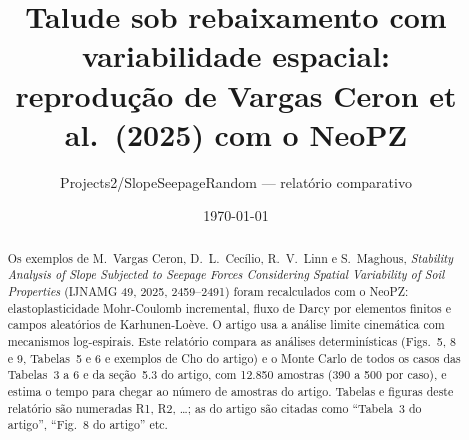 \documentclass[11pt,a4paper]{article}
\title{Talude sob rebaixamento com variabilidade espacial:\\ reprodução de Vargas Ceron et al.\ (2025) com o NeoPZ}
\author{Projects2/SlopeSeepageRandom --- relatório comparativo}
\date{\today}
\begin{document}
\maketitle

\begin{abstract}
Os exemplos de M.~Vargas Ceron, D.~L.~Cecílio, R.~V.~Linn e S.~Maghous, \emph{Stability Analysis of Slope Subjected to
Seepage Forces Considering Spatial Variability of Soil Properties} (IJNAMG 49, 2025, 2459--2491) foram recalculados
com o NeoPZ: elastoplasticidade Mohr-Coulomb incremental, fluxo de Darcy por elementos finitos e campos aleatórios de
Karhunen-Loève. O artigo usa a análise limite cinemática com mecanismos log-espirais. Este relatório compara as
análises determinísticas (Figs.~5, 8 e 9, Tabelas~5 e 6 e exemplos de Cho do artigo) e o Monte Carlo de todos os casos
das Tabelas~3 a 6 e da seção~5.3 do artigo, com 12.850 amostras (390 a 500 por caso), e
estima o tempo para chegar ao número de amostras do artigo. Tabelas e figuras deste relatório são numeradas R1, R2,
\ldots; as do artigo são citadas como ``Tabela~3 do artigo'', ``Fig.~8 do artigo'' etc.
\end{abstract}

\tableofcontents
\end{document}
